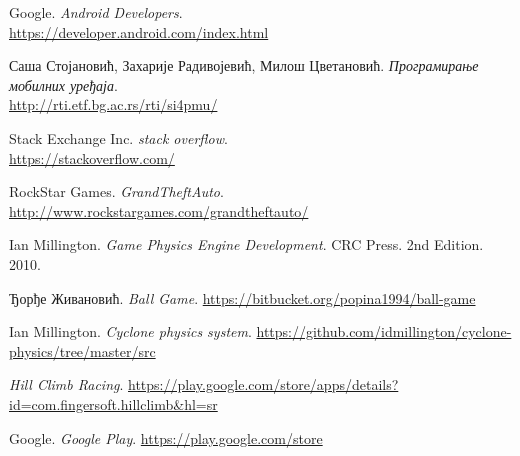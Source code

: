 \begin{thebibliography}{refs}
		Google.
		\emph{Android Developers}.\\
		\url{https://developer.android.com/index.html}

		Саша Стојановић, Захарије Радивојевић, Милош Цветановић.
		\emph{Програмирање мобилних уређаја}.\\
		\url{http://rti.etf.bg.ac.rs/rti/si4pmu/}

		Stack Exchange Inc.
		\emph{stack overflow}.\\
		\url{https://stackoverflow.com/}

		RockStar Games.
		\emph{GrandTheftAuto}.
		\url{http://www.rockstargames.com/grandtheftauto/}

		Ian Millington.
		\emph{Game Physics Engine Development}.
		CRC Press.
		2nd Edition. 2010.

		Ђорђе Живановић.
		\emph{Ball Game}.
		\url{https://bitbucket.org/popina1994/ball-game}


		Ian Millington.
		\emph{Cyclone physics system}.
		\url{https://github.com/idmillington/cyclone-physics/tree/master/src}

		\emph{Hill Climb Racing}.
		\url{https://play.google.com/store/apps/details?id=com.fingersoft.hillclimb&hl=sr}

		Google.
		\emph{Google Play}.
		\url{https://play.google.com/store}






\end{thebibliography}
